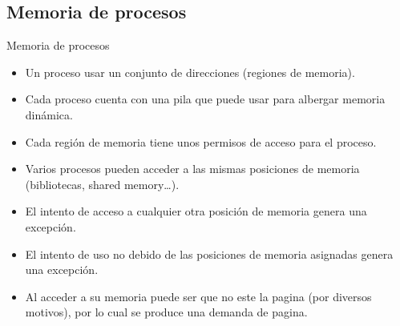 \subsection{Memoria de procesos}
\begin{frame}{Memoria de procesos}
	\begin{itemize}
		\item Un proceso usar un conjunto de direcciones (regiones de memoria).
		\item Cada proceso cuenta con una pila que puede usar para albergar memoria dinámica.
		\item Cada región de memoria tiene unos permisos de acceso para el proceso.
		\item Varios procesos pueden acceder a las mismas posiciones de memoria (bibliotecas, shared memory\dots).
		\item El intento de acceso a cualquier otra posición de memoria genera una excepción.
		\item El intento de uso no debido de las posiciones de memoria asignadas genera una excepción.
		\item Al acceder a su memoria puede ser que no este la pagina (por diversos motivos), por lo cual se produce una demanda de pagina.
	\end{itemize}
\end{frame}
